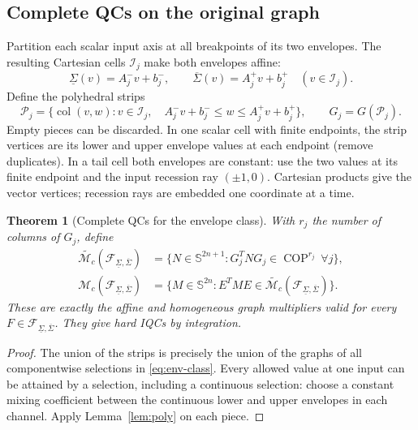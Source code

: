\documentclass[10pt,a4paper]{article}
\newtheorem{theorem}{Theorem}
\theoremstyle{definition}
\theoremstyle{remark}
\newcommand{\Ss}{\mathbb S}
\newcommand{\COP}{\operatorname{COP}}
\newcommand{\col}{\operatorname{col}}
\newcommand{\mc}{\mathcal M_c}
\newcommand{\Fenv}{\mathcal F_{\underline\Sigma,\overline\Sigma}}
\begin{document}
\subsection{Complete QCs on the original graph}
Partition each scalar input axis at all breakpoints of its two envelopes. The resulting Cartesian cells $\mathcal I_j$ make both envelopes affine:
\[
 \underline\Sigma(v)=A_j^-v+b_j^-,\qquad
 \overline\Sigma(v)=A_j^+v+b_j^+\quad(v\in\mathcal I_j).
\]
Define the polyhedral strips
\begin{equation}\label{eq:strip}
 \mathcal P_j=\{\col(v,w):v\in\mathcal I_j,\quad
 A_j^-v+b_j^-\le w\le A_j^+v+b_j^+\},\qquad G_j=G(\mathcal P_j).
\end{equation}
Empty pieces can be discarded. In one scalar cell with finite endpoints, the strip vertices are its lower and upper envelope values at each endpoint (remove duplicates). In a tail cell both envelopes are constant: use the two values at its finite endpoint and the input recession ray $(\pm1,0)$. Cartesian products give the vector vertices; recession rays are embedded one coordinate at a time.

\begin{theorem}[Complete QCs for the envelope class]\label{thm:envqc}
With $r_j$ the number of columns of $G_j$, define
\begin{align}
 \widetilde{\mc}(\Fenv)
 &=\{N\in\Ss^{2n+1}:G_j^TNG_j\in\COP^{r_j}\ \forall j\},\label{eq:env-aff-complete}\\
 \mc(\Fenv)
 &=\{M\in\Ss^{2n}:E^TME\in\widetilde{\mc}(\Fenv)\}.
\end{align}
These are exactly the affine and homogeneous graph multipliers valid for every $F\in\Fenv$. They give hard IQCs by integration.
\end{theorem}
\begin{proof}
The union of the strips is precisely the union of the graphs of all componentwise selections in \eqref{eq:env-class}. Every allowed value at one input can be attained by a selection, including a continuous selection: choose a constant mixing coefficient between the continuous lower and upper envelopes in each channel. Apply Lemma~\ref{lem:poly} on each piece.
\end{proof}
\end{document}
